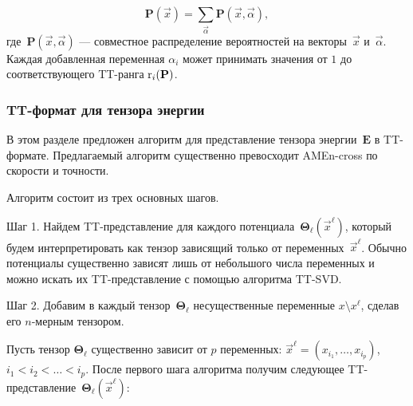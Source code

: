 \begin{equation}
\mathbf{P}(\vec{x}) = \sum_{\vec{\alpha}} \mathbf{P}(\vec{x}, \vec{\alpha}),
\end{equation}
где~$\mathbf{P}(\vec{x}, \vec{\alpha})$ --- совместное распределение вероятностей на векторы~$\vec{x}$ и~$\vec{\alpha}$.
Каждая добавленная переменная $\alpha_i$ может принимать значения от $1$ до соответствующего TT\hyp{}ранга $\operatorname{r}_i(\mathbf{P})$.


\subsubsection{TT\hyp{}формат для тензора энергии}
\label{sec:energy-representation}

В этом разделе предложен алгоритм для представление тензора энергии~$\mathbf{E}$ в TT\hyp{}формате. Предлагаемый алгоритм существенно превосходит AMEn-cross по скорости и точности.

Алгоритм состоит из трех основных шагов.

Шаг 1. Найдем TT\hyp{}представление для каждого потенциала~$\mathbf{\Theta}_\ell(\vec{x}^\ell)$, который будем интерпретировать как тензор зависящий только от переменных~$\vec{x}^\ell$. Обычно потенциалы существенно зависят лишь от небольшого числа переменных и можно искать их TT\hyp{}представление с помощью алгоритма TT-SVD.

Шаг 2. Добавим в каждый тензор~$\mathbf{\Theta}_\ell$ несущественные переменные $x \setminus x^\ell$, сделав его $n$-мерным тензором.

Пусть тензор $\mathbf{\Theta}_\ell$ существенно зависит от $p$ переменных: $\vec{x}^\ell = (x_{i_1}, \ldots, x_{i_p})$, $i_1 < i_2 < \ldots < i_p$. После первого шага алгоритма получим следующее TT\hyp{}представление~$\mathbf{\Theta}_\ell(\vec{x}^\ell)$:

